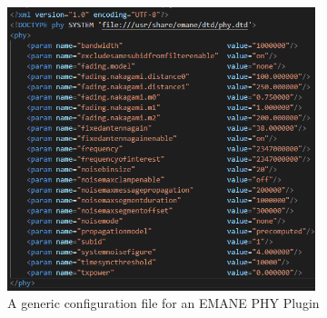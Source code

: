 \begin{figure}[!ht]
    \centering
    \includegraphics[width=0.8\textwidth,keepaspectratio]{Images/Chpt2/emane_phy.png}
    \caption{A generic configuration file for an EMANE PHY Plugin}
    \label{emane_phy}
\end{figure}

